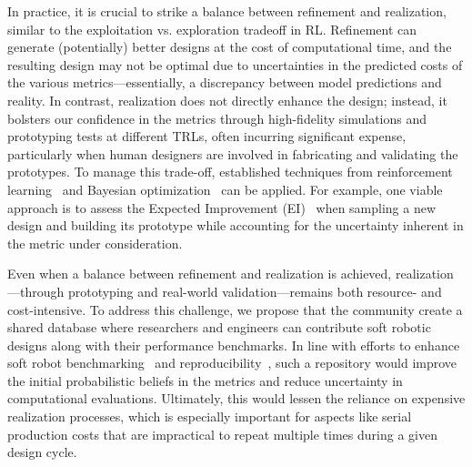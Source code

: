 In practice, it is crucial to strike a balance between refinement and realization, similar to the exploitation vs. exploration tradeoff in RL. Refinement can generate (potentially) better designs at the cost of computational time, and the resulting design may not be optimal due to uncertainties in the predicted costs of the various metrics—essentially, a discrepancy between model predictions and reality. In contrast, realization does not directly enhance the design; instead, it bolsters our confidence in the metrics through high-fidelity simulations and prototyping tests at different \glspl{TRL}, often incurring significant expense, particularly when human designers are involved in fabricating and validating the prototypes. To manage this trade-off, established techniques from reinforcement learning~\citep{sutton1998reinforcement} and Bayesian optimization~\citep{garnett2023bayesian} can be applied. For example, one viable approach is to assess the Expected Improvement (EI)~\citep{jones1998efficient} when sampling a new design and building its prototype while accounting for the uncertainty inherent in the metric under consideration.

Even when a balance between refinement and realization is achieved, realization—through prototyping and real-world validation—remains both resource- and cost-intensive. To address this challenge, we propose that the community create a shared database where researchers and engineers can contribute soft robotic designs along with their performance benchmarks. In line with efforts to enhance soft robot benchmarking~\citep{bhatia2021evolution, wang2023softzoo} and reproducibility~\citep{baines2024need}, such a repository would improve the initial probabilistic beliefs in the metrics and reduce uncertainty in computational evaluations. Ultimately, this would lessen the reliance on expensive realization processes, which is especially important for aspects like serial production costs that are impractical to repeat multiple times during a given design cycle.